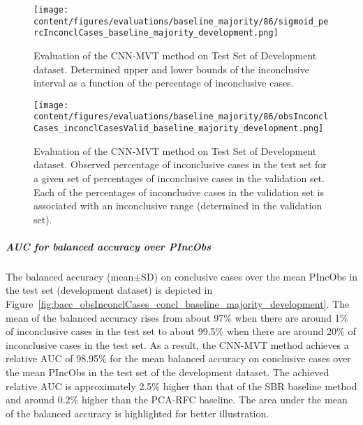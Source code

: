 \begin{figure}[ht]
  \centering
  \texttt{[image: content/figures/evaluations/baseline\_majority/86/sigmoid\_percInconclCases\_baseline\_majority\_development.png]}
  \caption{Evaluation of the CNN-MVT method on Test Set of Development dataset. 
  Determined upper and lower bounds of the inconclusive interval as a function of the percentage of inconclusive cases.} 
  \label{fig:baseline_majority_percInconclCases_development}
\end{figure}


\begin{figure}[ht]
  \centering
  \texttt{[image: content/figures/evaluations/baseline\_majority/86/obsInconclCases\_inconclCasesValid\_baseline\_majority\_development.png]}
  \caption{Evaluation of the CNN-MVT method on Test Set of Development dataset.
  Observed percentage of inconclusive cases in the test set 
  for a given set of percentages of inconclusive cases in the validation set.
  Each of the percentages of inconclusive cases in the validation set is associated 
  with an inconclusive range (determined in the validation set).} 
  \label{fig:obsInconclCases_inconclCasesValid_baseline_majority_development}
\end{figure} 


\subparagraph{AUC for balanced accuracy over PIncObs}

The balanced accuracy (mean$\pm$SD) on conclusive cases over the mean PIncObs
in the test set (development dataset) 
is depicted in Figure~\ref{fig:bacc_obsInconclCases_concl_baseline_majority_development}.
The mean of the balanced accuracy rises from about 97\% 
when there are around 1\% of inconclusive cases in the test set to about 99.5\% 
when there are around 20\% of inconclusive cases in the test set.
As a result, the CNN-MVT method achieves a relative AUC of 98.95\% for the mean balanced accuracy on conclusive cases
over the mean PIncObs in the test set of the development dataset.
The achieved relative AUC is approximately 2.5\% higher than that of the SBR baseline method 
and around 0.2\% higher than the PCA-RFC baseline.
The area under the mean of the balanced accuracy is highlighted for better illustration.


